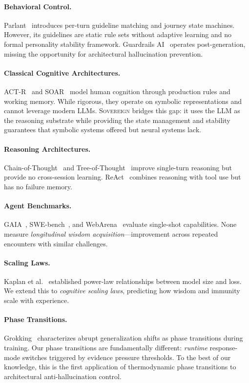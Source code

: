 \documentclass[11pt,a4paper]{article}
\begin{document}
\paragraph{Behavioral Control.}
Parlant~\cite{parlant} introduces per-turn guideline matching and journey
state machines. However, its guidelines are static rule sets without adaptive
learning and no formal personality stability framework.
Guardrails AI~\cite{guardrails} operates post-generation,
missing the opportunity for architectural hallucination prevention.

\paragraph{Classical Cognitive Architectures.}
ACT-R~\cite{actr} and SOAR~\cite{soar} model human cognition through
production rules and working memory. While rigorous, they operate on symbolic
representations and cannot leverage modern LLMs. \textsc{Sovereign} bridges
this gap: it uses the LLM as the reasoning substrate while providing the
state management and stability guarantees that symbolic systems offered
but neural systems lack.

\paragraph{Reasoning Architectures.}
Chain-of-Thought~\cite{cot} and Tree-of-Thought~\cite{tot} improve
single-turn reasoning but provide no cross-session learning.
ReAct~\cite{react} combines reasoning with tool use but has no failure memory.

\paragraph{Agent Benchmarks.}
GAIA~\cite{gaia}, SWE-bench~\cite{swebench}, and WebArena~\cite{webarena}
evaluate single-shot capabilities. None measure
\emph{longitudinal wisdom acquisition}---improvement across
repeated encounters with similar challenges.

\paragraph{Scaling Laws.}
Kaplan et al.~\cite{kaplan2020} established power-law relationships between
model size and loss. We extend this to \emph{cognitive scaling laws},
predicting how wisdom and immunity scale with experience.

\paragraph{Phase Transitions.}
Grokking~\cite{grokking} characterizes abrupt generalization shifts as phase
transitions during training. Our phase transitions are fundamentally
different: \emph{runtime} response-mode switches triggered by evidence
pressure thresholds. To the best of our knowledge, this is the first
application of thermodynamic phase transitions to architectural
anti-hallucination control.
\end{document}
